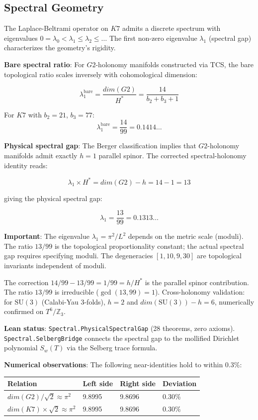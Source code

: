 \documentclass[11pt,a4paper]{article}
\newcommand{\Gtwo}{\mathrm{G}_2}
\newcommand{\Kseven}{K_7}
\newcommand{\dimE}{\mathrm{dim}}
\newcommand{\SU}{\mathrm{SU}}
\def\Gtwo{G2}%
\def\Kseven{K7}%
\def\dimE{dim}%
\begin{document}
\subsection{Spectral Geometry}

The Laplace-Beltrami operator on $\Kseven$ admits a discrete spectrum with eigenvalues $0 = \lambda_0 < \lambda_1 \le \lambda_2 \le \ldots$ The first non-zero eigenvalue $\lambda_1$ (spectral gap) characterizes the geometry's rigidity.

\textbf{Bare spectral ratio}: For $\Gtwo$-holonomy manifolds constructed via TCS, the bare topological ratio scales inversely with cohomological dimension:

$$\lambda_1^{\text{bare}} = \frac{\dimE(\Gtwo)}{H^*} = \frac{14}{b_2 + b_3 + 1}$$

For $\Kseven$ with $b_2 = 21$, $b_3 = 77$:
$$\lambda_1^{\text{bare}} = \frac{14}{99} = 0.1414\ldots$$

\textbf{Physical spectral gap}: The Berger classification implies that $\Gtwo$-holonomy manifolds admit exactly $h = 1$ parallel spinor. The corrected spectral-holonomy identity reads:

$$\lambda_1 \times H^* = \dimE(\Gtwo) - h = 14 - 1 = 13$$

giving the physical spectral gap:

$$\boxed{\lambda_1 = \frac{13}{99} = 0.1313\ldots}$$

\textbf{Important}: The eigenvalue $\lambda_1 = \pi^2/L^2$ depends on the metric scale (moduli). The ratio $13/99$ is the topological proportionality constant; the actual spectral gap requires specifying moduli. The degeneracies $[1, 10, 9, 30]$ are topological invariants independent of moduli.

The correction $14/99 - 13/99 = 1/99 = h/H^*$ is the parallel spinor contribution. The ratio $13/99$ is irreducible ($\gcd(13, 99) = 1$). Cross-holonomy validation: for $\SU(3)$ (Calabi-Yau 3-folds), $h = 2$ and $\dimE(\SU(3)) - h = 6$, numerically confirmed on $T^6/\mathbb{Z}_3$.

\textbf{Lean status}: \texttt{Spectral.PhysicalSpectralGap} (28 theorems, zero axioms). \texttt{Spectral.SelbergBridge} connects the spectral gap to the mollified Dirichlet polynomial $S_w(T)$ via the Selberg trace formula.

\textbf{Numerical observations}: The following near-identities hold to within 0.3\%:

\begin{table}[H]
\centering
\begin{tabular}{llll}
\toprule
Relation & Left side & Right side & Deviation \\
\midrule
$\dimE(\Gtwo)/\sqrt{2} \approx \pi^2$ & 9.8995 & 9.8696 & 0.30\% \\
$\dimE(\Kseven)\times\sqrt{2} \approx \pi^2$ & 9.8995 & 9.8696 & 0.30\% \\
\bottomrule
\end{tabular}
\end{table}
\end{document}
